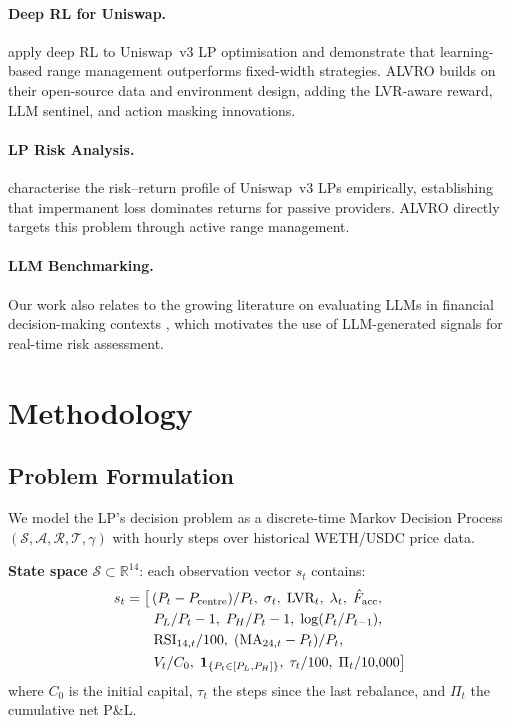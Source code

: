 \documentclass{article}
\begin{document}
\paragraph{Deep RL for Uniswap.}
\citet{xu2025} apply deep RL to Uniswap~v3 LP optimisation and demonstrate
that learning-based range management outperforms fixed-width strategies.
ALVRO builds on their open-source data and environment design, adding the
LVR-aware reward, LLM sentinel, and action masking innovations.

\paragraph{LP Risk Analysis.}
\citet{heimbach2021risks} characterise the risk--return profile of Uniswap~v3
LPs empirically, establishing that impermanent loss dominates returns for
passive providers.  ALVRO directly targets this problem through active
range management.

\paragraph{LLM Benchmarking.}
Our work also relates to the growing literature on evaluating LLMs in
financial decision-making contexts
\citep{benhenda2026lookaheadbench,chen2025vcbench,benhenda2026ycbench,zeng2025,chandak2026},
which motivates the use of LLM-generated signals for real-time risk assessment.

\section{Methodology}

\subsection{Problem Formulation}

We model the LP's decision problem as a discrete-time Markov Decision Process
$(\mathcal{S}, \mathcal{A}, \mathcal{R}, \mathcal{T}, \gamma)$ with hourly
steps over historical WETH/USDC price data.

\textbf{State space} $\mathcal{S} \subset \mathbb{R}^{14}$: each observation
vector $s_t$ contains:
\begin{align}
  s_t = \big[&\,(P_t - P_{\text{centre}})/P_t,\;\sigma_t,\;\text{LVR}_t,\;
               \lambda_t,\;\hat{F}_{\text{acc}},\notag\\
             &\;P_L/P_t - 1,\;P_H/P_t - 1,\;\log(P_t/P_{t-1}),\notag\\
             &\;\text{RSI}_{14,t}/100,\;(\text{MA}_{24,t}-P_t)/P_t,\notag\\
             &\;V_t/C_0,\;\mathbf{1}_{\{P_t \in [P_L,P_H]\}},\;
               \tau_t/100,\;\Pi_t/10{,}000\big]
\end{align}
where $C_0$ is the initial capital, $\tau_t$ the steps since the last
rebalance, and $\Pi_t$ the cumulative net P\&L.
\end{document}
